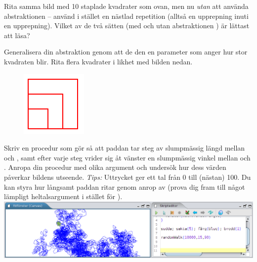 \Subtask Rita samma bild med 10 staplade kvadrater som ovan, men nu \emph{utan} att använda abstraktionen  -- använd i stället en nästlad repetition (alltså en upprepning inuti en upprepning). Vilket av de två sätten (med och utan abstraktionen ) är lättast att läsa? %

\Subtask Generalisera din abstraktion  genom att de den en parameter  som anger hur stor kvadraten blir. Rita flera kvadrater i likhet med bilden nedan.

\begin{figure}[H]
\includegraphics{../img/kojo/square-param}
\end{figure}


\Subtask Skriv en procedur  som gör så att paddan tar  steg av slumpmässig längd mellan  och , samt efter varje steg vrider sig åt vänster en slumpmässig vinkel mellan  och . Anropa din procedur med olika argument och undersök hur dess värden påverkar bildens utseende. \emph{Tips:} Uttrycket  ger ett tal från 0 till (nästan) 100. Du kan styra hur långsamt paddan ritar genom anrop av  (prova dig fram till något  lämpligt heltalsargument i stället för ).
\vspace{2em}\\\includegraphics[width=\textwidth]{../img/kojo/random-walk.png}






